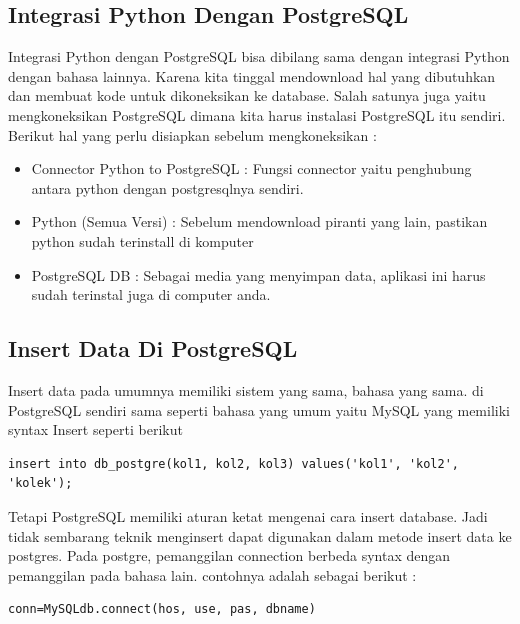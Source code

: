 \subsection{Integrasi Python Dengan PostgreSQL} 
Integrasi Python dengan PostgreSQL bisa dibilang sama dengan integrasi Python dengan bahasa lainnya.  Karena kita tinggal mendownload hal yang dibutuhkan dan membuat kode untuk dikoneksikan ke database. Salah satunya juga yaitu mengkoneksikan PostgreSQL dimana kita harus instalasi PostgreSQL itu sendiri. Berikut hal yang perlu disiapkan sebelum mengkoneksikan : 
\begin{itemize}
\item Connector Python to PostgreSQL : Fungsi connector yaitu penghubung antara python dengan postgresqlnya sendiri. 
\item Python (Semua Versi) : Sebelum mendownload piranti yang lain, pastikan python sudah terinstall di komputer
\item PostgreSQL DB : Sebagai media yang menyimpan data, aplikasi ini harus sudah terinstal juga di computer anda.
\end{itemize}

\subsection{Insert Data Di PostgreSQL}
Insert data pada umumnya memiliki sistem yang sama, bahasa yang sama. di PostgreSQL sendiri sama seperti bahasa yang umum yaitu MySQL yang memiliki syntax Insert seperti berikut
\begin{verbatim}
insert into db_postgre(kol1, kol2, kol3) values('kol1', 'kol2', 'kolek');
\end{verbatim}
Tetapi PostgreSQL memiliki aturan ketat mengenai cara insert database. Jadi tidak sembarang teknik menginsert dapat digunakan dalam metode insert data ke postgres. Pada postgre, pemanggilan connection berbeda syntax dengan pemanggilan pada bahasa lain. contohnya adalah sebagai berikut : 
\begin{verbatim}
conn=MySQLdb.connect(hos, use, pas, dbname)
\end{verbatim}

